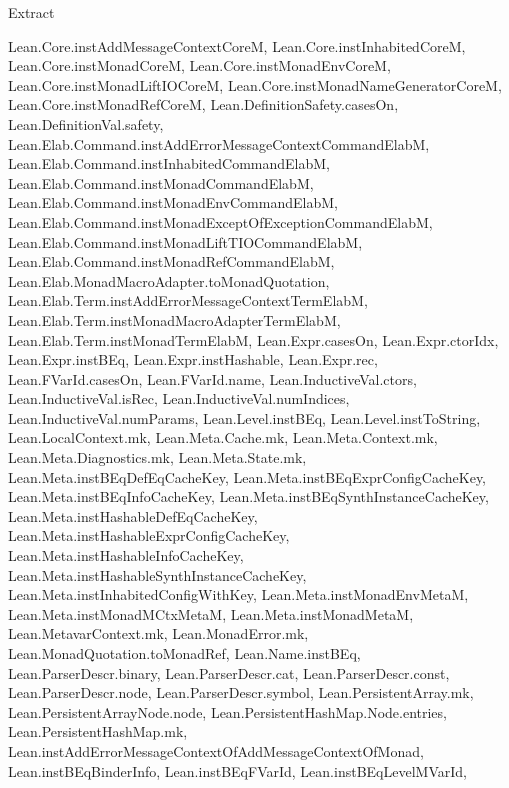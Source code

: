 \begin{lexlean}{Extract}
\begin{toolingmodule}
{{        Lean.Core.instAddMessageContextCoreM,
        Lean.Core.instInhabitedCoreM,
        Lean.Core.instMonadCoreM,
        Lean.Core.instMonadEnvCoreM,
        Lean.Core.instMonadLiftIOCoreM,
        Lean.Core.instMonadNameGeneratorCoreM,
        Lean.Core.instMonadRefCoreM,
        Lean.DefinitionSafety.casesOn,
        Lean.DefinitionVal.safety,
        Lean.Elab.Command.instAddErrorMessageContextCommandElabM,
        Lean.Elab.Command.instInhabitedCommandElabM,
        Lean.Elab.Command.instMonadCommandElabM,
        Lean.Elab.Command.instMonadEnvCommandElabM,
        Lean.Elab.Command.instMonadExceptOfExceptionCommandElabM,
        Lean.Elab.Command.instMonadLiftTIOCommandElabM,
        Lean.Elab.Command.instMonadRefCommandElabM,
        Lean.Elab.MonadMacroAdapter.toMonadQuotation,
        Lean.Elab.Term.instAddErrorMessageContextTermElabM,
        Lean.Elab.Term.instMonadMacroAdapterTermElabM,
        Lean.Elab.Term.instMonadTermElabM,
        Lean.Expr.casesOn,
        Lean.Expr.ctorIdx,
        Lean.Expr.instBEq,
        Lean.Expr.instHashable,
        Lean.Expr.rec,
        Lean.FVarId.casesOn,
        Lean.FVarId.name,
        Lean.InductiveVal.ctors,
        Lean.InductiveVal.isRec,
        Lean.InductiveVal.numIndices,
        Lean.InductiveVal.numParams,
        Lean.Level.instBEq,
        Lean.Level.instToString,
        Lean.LocalContext.mk,
        Lean.Meta.Cache.mk,
        Lean.Meta.Context.mk,
        Lean.Meta.Diagnostics.mk,
        Lean.Meta.State.mk,
        Lean.Meta.instBEqDefEqCacheKey,
        Lean.Meta.instBEqExprConfigCacheKey,
        Lean.Meta.instBEqInfoCacheKey,
        Lean.Meta.instBEqSynthInstanceCacheKey,
        Lean.Meta.instHashableDefEqCacheKey,
        Lean.Meta.instHashableExprConfigCacheKey,
        Lean.Meta.instHashableInfoCacheKey,
        Lean.Meta.instHashableSynthInstanceCacheKey,
        Lean.Meta.instInhabitedConfigWithKey,
        Lean.Meta.instMonadEnvMetaM,
        Lean.Meta.instMonadMCtxMetaM,
        Lean.Meta.instMonadMetaM,
        Lean.MetavarContext.mk,
        Lean.MonadError.mk,
        Lean.MonadQuotation.toMonadRef,
        Lean.Name.instBEq,
        Lean.ParserDescr.binary,
        Lean.ParserDescr.cat,
        Lean.ParserDescr.const,
        Lean.ParserDescr.node,
        Lean.ParserDescr.symbol,
        Lean.PersistentArray.mk,
        Lean.PersistentArrayNode.node,
        Lean.PersistentHashMap.Node.entries,
        Lean.PersistentHashMap.mk,
        Lean.instAddErrorMessageContextOfAddMessageContextOfMonad,
        Lean.instBEqBinderInfo,
        Lean.instBEqFVarId,
        Lean.instBEqLevelMVarId,
}}
\end{toolingmodule}
\end{lexlean}
